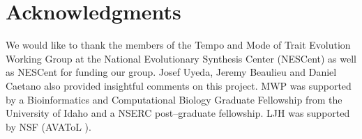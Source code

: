 \documentclass[a4paper,12pt]{article}
\begin{document}
\section*{Acknowledgments}

We would like to thank the members of the Tempo and Mode of Trait Evolution Working Group at the National Evolutionary Synthesis Center (NESCent) as well as NESCent for funding our group. Josef Uyeda, Jeremy Beaulieu and Daniel Caetano also provided insightful comments on this project. MWP was supported by a Bioinformatics and Computational Biology Graduate Fellowship from the University of Idaho and a NSERC post--graduate fellowship. LJH was supported by NSF (AVAToL ).



\newpage


\end{document}
